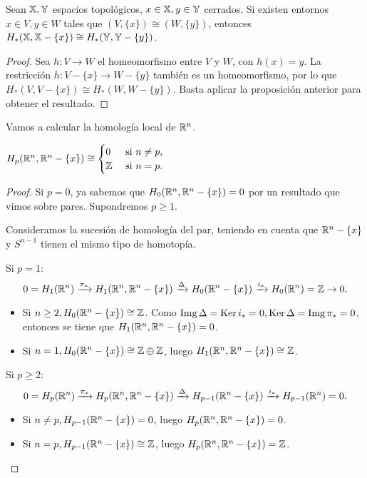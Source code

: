 \begin{proposition}
  Sean ${\mathbb X}, {\mathbb Y}$ espacios topológicos, $x \in {\mathbb X}, y \in {\mathbb Y}$ cerrados. Si existen entornos $x \in V, y \in W$ tales que $(V, \{x\}) \cong (W, \{y\})$,
  entonces $H_*({\mathbb X}, {\mathbb X} - \{x\}) \cong H_*({\mathbb Y}, {\mathbb Y} - \{y\})$.
\end{proposition}

\begin{proof}
  Sea $h \colon V \to W$ el homeomorfismo entre $V$ y $W$, con $h(x) = y$. La restricción $h \colon V - \{x\} \to W - \{y\}$ también es un homeomorfismo,
  por lo que $H_*(V, V - \{x\}) \cong H_*(W, W - \{y\})$. Basta aplicar la proposición anterior para obtener el resultado.
\end{proof}

Vamos a calcular la homología local de $\mathbb{R}^n$.

\begin{proposition}
  $H_p(\mathbb{R}^n, \mathbb{R}^n - \{x\}) \cong \begin{cases} 0 &\text{ si } n \neq p, \\ \mathbb{Z} &\text{ si } n = p. \end{cases}$
\end{proposition}

\begin{proof}
  Si $p = 0$, ya sabemos que $H_0(\mathbb{R}^n, \mathbb{R}^n - \{x\}) = 0$ por un resultado que vimos sobre pares. Supondremos $p \geq 1$.

  Consideramos la sucesión de homología del par, teniendo en cuenta que $\mathbb{R}^n - \{x\}$ y $S^{n-1}$ tienen el mismo tipo de homotopía.

  Si $p = 1$:
  \[ 0 = H_1(\mathbb{R}^n) \xrightarrow{\pi_*} H_1(\mathbb{R}^n, \mathbb{R}^n - \{x\}) \xrightarrow{\Delta} H_0(\mathbb{R}^n - \{x\}) \xrightarrow{i_*} H_0(\mathbb{R}^n) = \mathbb{Z} \to 0. \]
  \begin{itemize}
    \item Si $n \geq 2, H_0(\mathbb{R}^n - \{x\}) \cong \mathbb{Z}$. Como $\operatorname{Img} \Delta = \operatorname{Ker} i_* = 0, \operatorname{Ker} \Delta = \operatorname{Img} \pi_* = 0$, entonces se tiene que
          $H_1(\mathbb{R}^n, \mathbb{R}^n - \{x\}) = 0$.
    \item Si $n = 1, H_0(\mathbb{R}^n - \{x\}) \cong \mathbb{Z} \oplus \mathbb{Z}$, luego $H_1(\mathbb{R}^n, \mathbb{R}^n - \{x\}) \cong \mathbb{Z}$.
  \end{itemize}

  Si $p \geq 2$:
  \[ 0 = H_p(\mathbb{R}^n) \xrightarrow{\pi_*} H_p(\mathbb{R}^n, \mathbb{R}^n - \{x\}) \xrightarrow{\Delta} H_{p-1}(\mathbb{R}^n - \{x\}) \xrightarrow{i_*} H_{p-1}(\mathbb{R}^n) = 0. \]
  \begin{itemize}
    \item Si $n \neq p, H_{p-1}(\mathbb{R}^n - \{x\}) = 0$, luego $H_p(\mathbb{R}^n, \mathbb{R}^n - \{x\}) = 0$.
    \item Si $n = p, H_{p-1}(\mathbb{R}^n - \{x\}) \cong \mathbb{Z}$, luego  $H_p(\mathbb{R}^n, \mathbb{R}^n - \{x\}) = \mathbb{Z}$.
  \end{itemize}
\end{proof}

